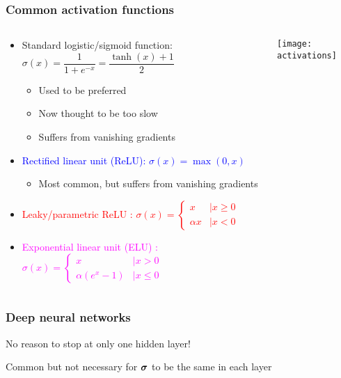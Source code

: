 \begin{frame}
    \frametitle{Common activation functions}
    \begin{columns}
        \begin{column}{2.5in}
            \begin{itemize}
                \item \textcolor{Green4}{Standard logistic/sigmoid function: $\sigma(x) = \dfrac{1}{1 + e^{-x}} = \dfrac{\tanh(x) + 1}{2}$}
                \begin{itemize}
                    \item Used to be preferred
                    \item Now thought to be too slow
                    \item Suffers from vanishing gradients
                \end{itemize}
                \item \textcolor{blue}{Rectified linear unit (ReLU): $\sigma(x) = \max(0, x)$}
                \begin{itemize}
                    \item Most common, but suffers from vanishing gradients
                \end{itemize}
                \item \textcolor{red}{Leaky/parametric ReLU \citep{MaasICML13}: $\sigma(x) = \begin{cases} x &\mid x \ge 0 \\ \alpha x &| x < 0 \end{cases}$}
                \item \textcolor{magenta}{Exponential linear unit (ELU) \citep{ClevertICLR16}: $\sigma(x) = \begin{cases} x &\mid x > 0 \\ \alpha (e^x - 1) &\mid x \le 0 \end{cases}$}
            \end{itemize}
        \end{column}
        \begin{column}{2in}
            \texttt{[image: activations]}
        \end{column}
    \end{columns}
\end{frame}

\begin{frame}
    \frametitle{Deep neural networks}

    No reason to stop at only one hidden layer!

    \vspace{1mm}
    
    \vspace{1mm}

    Common but not necessary for $\bm{\sigma}$ to be the same in each layer
\end{frame}

